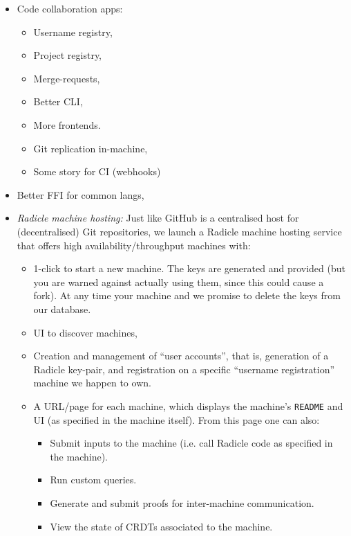 \documentclass[a4paper, oneside, 10pt]{amsart}
\begin{document}
\begin{itemize}
\item
  Code collaboration apps:
  \begin{itemize}
  \item
    Username registry,
  \item
    Project registry,
  \item
    Merge-requests,
  \item
    Better CLI,
  \item
    More frontends.
  \item
    Git replication in-machine,
  \item
    Some story for CI (webhooks)
  \end{itemize}
\item
  Better FFI for common langs,
\item
  \emph{Radicle machine hosting:} Just like GitHub is a centralised host for
  (decentralised) Git repositories, we launch a Radicle machine hosting service
  that offers high availability/throughput machines with:
  \begin{itemize}
  \item
    1-click to start a new machine. The keys are generated and provided (but you
    are warned against actually using them, since this could cause a fork). At
    any time your machine and we promise to delete the keys from our database.
  \item
    UI to discover machines,
  \item
    Creation and management of ``user accounts'', that is, generation of a
    Radicle key-pair, and registration on a specific ``username registration''
    machine we happen to own.
  \item
    A URL/page for each machine, which displays the machine's \texttt{README}
    and UI (as specified in the machine itself). From this page one can also:
    \begin{itemize}
    \item
      Submit inputs to the machine (i.e. call Radicle code as specified in the
      machine).
    \item
      Run custom queries.
    \item
      Generate and submit proofs for inter-machine communication.
    \item
      View the state of CRDTs associated to the machine.
    \end{itemize}
  \end{itemize}
\end{itemize}
\end{document}
